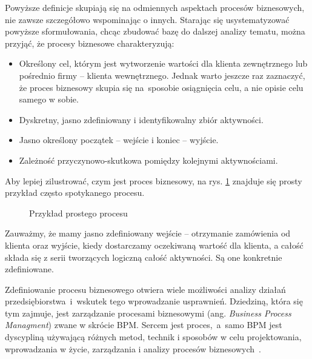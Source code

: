 Powyższe definicje skupiają się na odmiennych aspektach procesów biznesowych, nie zawsze szczegółowo wspominając o innych. Starając się usystematyzować powyższe sformułowania, chcąc zbudować bazę do dalszej analizy tematu, można przyjąć, że procesy biznesowe charakteryzują:
\begin{itemize}
  \item[•] Określony cel, którym jest wytworzenie wartości dla klienta zewnętrznego lub pośrednio firmy -- klienta wewnętrznego. Jednak warto jeszcze raz zaznaczyć, że proces biznesowy skupia się na~sposobie osiągnięcia celu, a nie opisie celu samego w sobie. 
  \item[•] Dyskretny, jasno zdefiniowany i identyfikowalny zbiór aktywności. 
  \item[•] Jasno określony początek -- wejście i koniec -- wyjście.
  \item[•] Zależność przyczynowo-skutkowa pomiędzy kolejnymi aktywnościami.
\end{itemize}

Aby lepiej zilustrować, czym jest proces biznesowy, na rys. \ref{fig:simple_business_process} znajduje się prosty przykład często spotykanego procesu.

\begin{figure}[H]
	\caption{\label{fig:simple_business_process}Przykład prostego procesu}
\end{figure}

Zauważmy, że mamy jasno zdefiniowany wejście -- otrzymanie zamówienia od klienta oraz wyjście, kiedy dostarczamy oczekiwaną wartość dla klienta, a całość składa się z serii tworzących logiczną całość aktywności. Są one konkretnie zdefiniowane.

Zdefiniowanie procesu biznesowego otwiera wiele możliwości analizy działań przedsiębiorstwa~i~wskutek tego wprowadzanie usprawnień. Dziedziną, która się tym zajmuje, jest zarządzanie procesami biznesowymi (ang. \textit{Business Process Managment}) zwane w skrócie BPM. Sercem jest proces,~a~samo BPM jest dyscypliną używającą różnych metod, technik i sposobów w celu projektowania, wprowadzania w życie, zarządzania i analizy procesów biznesowych~\cite{BPMDemystified}. 

